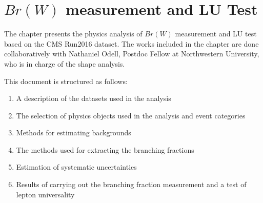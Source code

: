 \chapter{$Br(W)$ measurement and LU Test}
\label{sec:analysis}


The chapter presents the physics analysis of $Br(W)$ measurement and LU test based on the CMS Run2016 dataset. 
The works included in the chapter are done collaboratively with Nathaniel Odell, Postdoc Fellow at Northwestern University, 
who is in charge of the shape analysis. 





This document is structured as follows:

\begin{enumerate}
    \item A description of the datasets used in the analysis
    \item The selection of physics objects used in the analysis and event categories
    \item Methods for estimating backgrounds
    \item The methods used for extracting the branching fractions
    \item Estimation of systematic uncertainties
    \item Results of carrying out the branching fraction measurement and a test of lepton universality
\end{enumerate}
    
    











